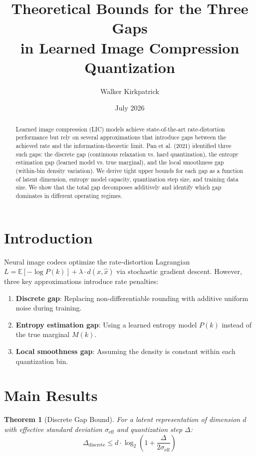 \documentclass[11pt]{article}
\title{\textbf{Theoretical Bounds for the Three Gaps\\
in Learned Image Compression Quantization}}
\author{Walker Kirkpatrick}
\date{July 2026}
\newtheorem{theorem}{Theorem}[section]
\begin{document}
\maketitle

\begin{abstract}
Learned image compression (LIC) models achieve state-of-the-art rate-distortion performance but rely on several approximations that introduce gaps between the achieved rate and the information-theoretic limit. Pan et al. (2021) identified three such gaps: the discrete gap (continuous relaxation vs. hard quantization), the entropy estimation gap (learned model vs. true marginal), and the local smoothness gap (within-bin density variation). We derive tight upper bounds for each gap as a function of latent dimension, entropy model capacity, quantization step size, and training data size. We show that the total gap decomposes additively and identify which gap dominates in different operating regimes.
\end{abstract}

\section{Introduction}

Neural image codecs optimize the rate-distortion Lagrangian $L = \mathbb{E}[-\log P(k)] + \lambda \cdot d(x, \hat{x})$ via stochastic gradient descent. However, three key approximations introduce rate penalties:

\begin{enumerate}
    \item \textbf{Discrete gap}: Replacing non-differentiable rounding with additive uniform noise during training.
    \item \textbf{Entropy estimation gap}: Using a learned entropy model $P(k)$ instead of the true marginal $M(k)$.
    \item \textbf{Local smoothness gap}: Assuming the density is constant within each quantization bin.
\end{enumerate}

\section{Main Results}

\begin{theorem}[Discrete Gap Bound]
\label{thm:discrete}
For a latent representation of dimension $d$ with effective standard deviation $\sigma_{\text{eff}}$ and quantization step $\Delta$:
\[
\Delta_{\text{discrete}} \leq d \cdot \log_2\!\left(1 + \frac{\Delta}{2\sigma_{\text{eff}}}\right)
\]
\end{theorem}
\end{document}
